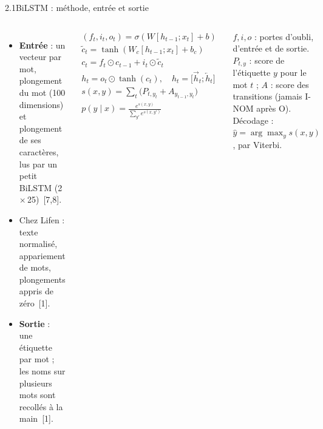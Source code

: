 \documentclass[11pt,aspectratio=169]{beamer}
\newcommand{\refs}[1]{{\color{mlblue}[#1]}}
\begin{document}
\begin{frame}{2.1\quad BiLSTM : méthode, entrée et sortie}
\begin{columns}[T]
    \raggedright\footnotesize
    \begin{itemize}\setlength{\itemsep}{1pt}
      \item \textbf{Entrée} : un vecteur par mot, plongement du mot (100 dimensions) et
        plongement de ses caractères, lus par un petit BiLSTM (2\,×\,25)~\refs{7,8}.
      \item Chez Lifen : texte normalisé, appariement de mots, plongements appris de
        zéro~\refs{1}.
      \item \textbf{Sortie} : une étiquette par mot ; les noms sur plusieurs mots sont
        recollés à la main~\refs{1}.
    \end{itemize}
    \footnotesize
    \begin{gather*}
      (f_t, i_t, o_t) = \sigma\!\left(W [h_{t-1}; x_t] + b\right) \\
      \tilde c_t = \tanh\!\left(W_c [h_{t-1}; x_t] + b_c\right) \\
      c_t = f_t \odot c_{t-1} + i_t \odot \tilde c_t \\
      h_t = o_t \odot \tanh(c_t), \quad h_t = \big[\overrightarrow{h}_t ; \overleftarrow{h}_t\big] \\
      s(x, y) = \sum_{t} \big(P_{t, y_t} + A_{y_{t-1}, y_t}\big) \\
      p(y \mid x) = \frac{e^{s(x, y)}}{\sum_{y'} e^{s(x, y')}}
    \end{gather*}
    {\scriptsize\color{mlgray} $f, i, o$ : portes d'oubli, d'entrée et de sortie.
    $P_{t,y}$ : score de l'étiquette $y$ pour le mot $t$ ; $A$ : score des transitions
    (jamais I-NOM après O). Décodage : $\hat y = \arg\max_y s(x, y)$, par Viterbi.\par}
  \end{columns}
\end{frame}
\end{document}
